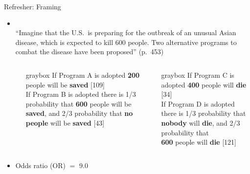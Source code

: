 \documentclass[aspectratio=169]{beamer}
\newenvironment{colbox}[1][\textwidth]%
  {\begin{beamercolorbox}[wd=#1, rounded=true, shadow=true]{graybox}}
  {\end{beamercolorbox}}
\begin{document}
\begin{frame}{Refresher: Framing}

\begin{itemize}
\item \citet{ TverskyKahneman81}\\[1ex]

``Imagine that the U.S.\ is preparing for the outbreak of an unusual Asian
disease, which is expected to kill 600 people. Two alternative programs to
combat the disease have been proposed'' (p.~453)\\[1ex]

\begin{columns}
\begin{column}{0.4 cm}
\end{column}
%
\begin{column}{5.8 cm}
\begin{colbox}
If Program A is adopted \textbf{200} people will be \textbf{saved} [109]\\[2ex]

If Program B is adopted there is 1/3 probability that \textbf{600} people
will be \textbf{saved}, and 2/3 probability that \textbf{no people} will be
\textbf{saved} [43]
\end{colbox}
\end{column}
%
\begin{column}{5.8 cm}
\begin{colbox}
If Program C is adopted \textbf{400} people will
\textbf{die} [34]\\[2ex]

If Program D is adopted there is 1/3 probability that \textbf{nobody} will
\textbf{die}, and 2/3 probability that\\
\textbf{600} people will \textbf{die} [121]
\end{colbox}
\end{column}
\end{columns}

\vspace{2ex}

\item Odds ratio (OR) $=$ 9.0
\end{itemize}
\end{frame}
\end{document}
